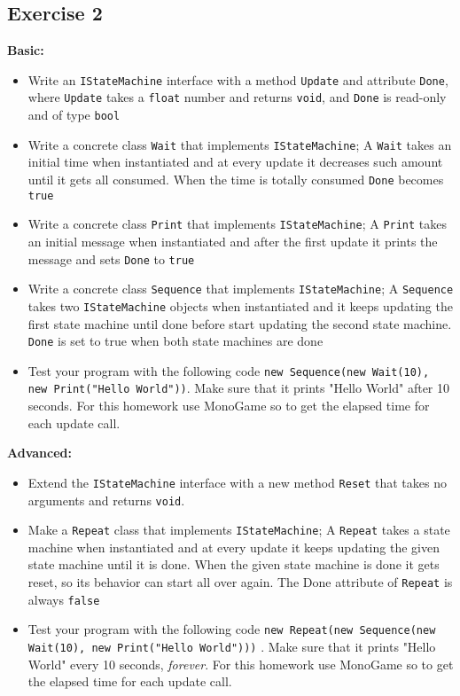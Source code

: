      \subsection{Exercise 2}
     \label{chapter: Reuse through polymorphism}
     	 \textbf{Basic:}
	     \begin{itemize}
	     	\item Write an \texttt{IStateMachine} interface with a method \texttt{Update} and attribute \texttt{Done}, where \texttt{Update} takes a \texttt{float} number and returns \texttt{void}, and \texttt{Done} is read-only and of type \texttt{bool}
	     	\item Write a concrete class \texttt{Wait} that implements \texttt{IStateMachine}; A \texttt{Wait} takes an initial time when instantiated and at every update it decreases such amount until it gets all consumed. When the time is totally consumed \texttt{Done} becomes \texttt{true}
		    \item Write a concrete class \texttt{Print} that implements \texttt{IStateMachine}; A \texttt{Print} takes an initial message when instantiated and after the first update it prints the message and sets \texttt{Done} to \texttt{true}
		    \item Write a concrete class \texttt{Sequence} that implements \texttt{IStateMachine}; A \texttt{Sequence} takes two \texttt{IStateMachine} objects when instantiated and it keeps updating the first state machine until done before start updating the second state machine. \texttt{Done} is set to true when both state machines are done  
		    \item Test your program with the following code \texttt{new Sequence(new Wait(10), new Print("Hello World"))}. Make sure that it prints "Hello World" after 10 seconds. For this homework use MonoGame so to get the elapsed time for each update call.
	     \end{itemize}
	     \textbf{Advanced:}
	     \begin{itemize}
	     	\item Extend the \texttt{IStateMachine} interface with a new method \texttt{Reset} that takes no arguments and returns \texttt{void}.
	     	\item Make a \texttt{Repeat} class that implements \texttt{IStateMachine}; A \texttt{Repeat} takes a state machine when instantiated and at every update it keeps updating the given state machine until it is done. When the given state machine is done it gets reset, so its behavior can start all over again. The {Done} attribute of \texttt{Repeat} is always \texttt{false}
	     	\item Test your program with the following code \texttt{new Repeat(new Sequence(new Wait(10), new Print("Hello World")))} . Make sure that it prints "Hello World" every 10 seconds, \textit{forever}. For this homework use MonoGame so to get the elapsed time for each update call.
	     \end{itemize}

